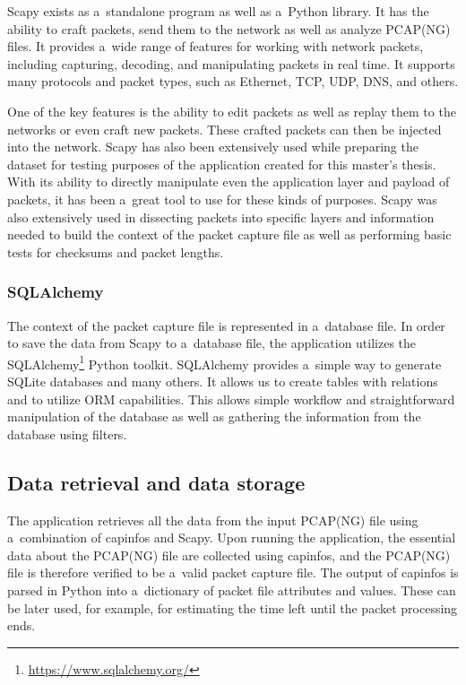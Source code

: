 \documentclass[
  printed,     %
  color,       %
  oneside,     %
  nosansbold,  %
  nocolorbold, %
  nolof,         %
  nolot,         %
]{fithesis4}
\begin{document}
Scapy exists as a~standalone program as well as a~Python library. It has the ability to craft packets, send them to the network as well as analyze PCAP(NG) files. It provides a~wide range of features for working with network packets, including capturing, decoding, and manipulating packets in real time. It supports many protocols and packet types, such as Ethernet, TCP, UDP, DNS, and others.

One of the key features is the ability to edit packets as well as replay them to the networks or even craft new packets. These crafted packets can then be injected into the network. Scapy has also been extensively used while preparing the dataset for testing purposes of the application created for this master's thesis. With its ability to directly manipulate even the application layer and payload of packets, it has been a~great tool to use for these kinds of purposes. Scapy was also extensively used in dissecting packets into specific layers and information needed to build the context of the packet capture file as well as performing basic tests for checksums and packet lengths.

\subsubsection{SQLAlchemy}

The context of the packet capture file is represented in a~database file. In order to save the data from Scapy to a~database file, the application utilizes the SQLAlchemy\footnote{\url{https://www.sqlalchemy.org/}} Python toolkit. SQLAlchemy provides a~simple way to generate SQLite databases and many others. It allows us to create tables with relations and to utilize ORM capabilities. This allows simple workflow and straightforward manipulation of the database as well as gathering the information from the database using filters.

\subsection{Data retrieval and data storage}
\label{sec:ds}

The application retrieves all the data from the input PCAP(NG) file using a~combination of capinfos and Scapy. Upon running the application, the essential data about the PCAP(NG) file are collected using capinfos, and the PCAP(NG) file is therefore verified to be a~valid packet capture file. The output of capinfos is parsed in Python into a~dictionary of packet file attributes and values. These can be later used, for example, for estimating the time left until the packet processing ends.
\end{document}
